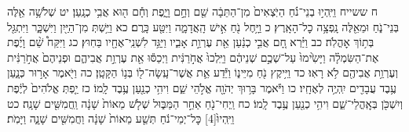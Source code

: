 \documentclass[twoside, openany, parskip=half, 11pt]{book}
\begin{document}
ח ששייח וַיִּֽהְי֣וּ בְנֵי־נֹ֗חַ הַיֹּֽצְאִים֙ מִן־הַתֵּבָ֔ה שֵׁ֖ם וְחָ֣ם וָיָ֑פֶת וְחָ֕ם ה֖וּא אֲבִ֥י כְנָֽעַן׃ יט שְׁלֹשָׁ֥ה אֵ֖לֶּה בְּנֵי־נֹ֑חַ וּמֵאֵ֖לֶּה נָֽפְצָ֥ה כׇל־הָאָֽרֶץ׃ כ וַיָּ֥חֶל נֹ֖חַ אִ֣ישׁ הָֽאֲדָמָ֑ה וַיִּטַּ֖ע כָּֽרֶם׃ כא וַיֵּ֥שְׁתְּ מִן־הַיַּ֖יִן וַיִּשְׁכָּ֑ר וַיִּתְגַּ֖ל בְּת֥וֹךְ אׇהֳלֹֽה׃ כב וַיַּ֗רְא חָ֚ם אֲבִ֣י כְנַ֔עַן אֵ֖ת עֶרְוַ֣ת אָבִ֑יו וַיַּגֵּ֥ד לִשְׁנֵֽי־אֶחָ֖יו בַּחֽוּץ׃ כג וַיִּקַּח֩ שֵׁ֨ם וָיֶ֜פֶת אֶת־הַשִּׂמְלָ֗ה וַיָּשִׂ֙ימוּ֙ עַל־שְׁכֶ֣ם שְׁנֵיהֶ֔ם וַיֵּֽלְכוּ֙ אֲחֹ֣רַנִּ֔ית וַיְכַסּ֕וּ אֵ֖ת עֶרְוַ֣ת אֲבִיהֶ֑ם וּפְנֵיהֶם֙ אֲחֹ֣רַנִּ֔ית וְעֶרְוַ֥ת אֲבִיהֶ֖ם לֹ֥א רָאֽוּ׃ כד וַיִּ֥יקֶץ נֹ֖חַ מִיֵּינ֑וֹ וַיֵּ֕דַע אֵ֛ת אֲשֶׁר־עָֽשָׂה־ל֖וֹ בְּנ֥וֹ הַקָּטָֽן׃ כה וַיֹּ֖אמֶר אָר֣וּר כְּנָ֑עַן עֶ֥בֶד עֲבָדִ֖ים יִֽהְיֶ֥ה לְאֶחָֽיו׃ כו וַיֹּ֕אמֶר בָּר֥וּךְ יְהֹוָ֖ה אֱלֹ֣הֵי שֵׁ֑ם וִיהִ֥י כְנַ֖עַן עֶ֥בֶד לָֽמוֹ׃ כז יַ֤פְתְּ אֱלֹהִים֙ לְיֶ֔פֶת וְיִשְׁכֹּ֖ן בְּאׇֽהֳלֵי־שֵׁ֑ם וִיהִ֥י כְנַ֖עַן עֶ֥בֶד לָֽמוֹ׃ כח וַֽיְחִי־נֹ֖חַ אַחַ֣ר הַמַּבּ֑וּל שְׁלֹ֤שׁ מֵאוֹת֙ שָׁנָ֔ה וַֽחֲמִשִּׁ֖ים שָׁנָֽה׃ כט וַיִּֽהְיוּ֙‏[4] כׇּל־יְמֵי־נֹ֔חַ תְּשַׁ֤ע מֵאוֹת֙ שָׁנָ֔ה וַחֲמִשִּׁ֖ים שָׁנָ֑ה וַיָּמֹֽת׃
\end{document}
